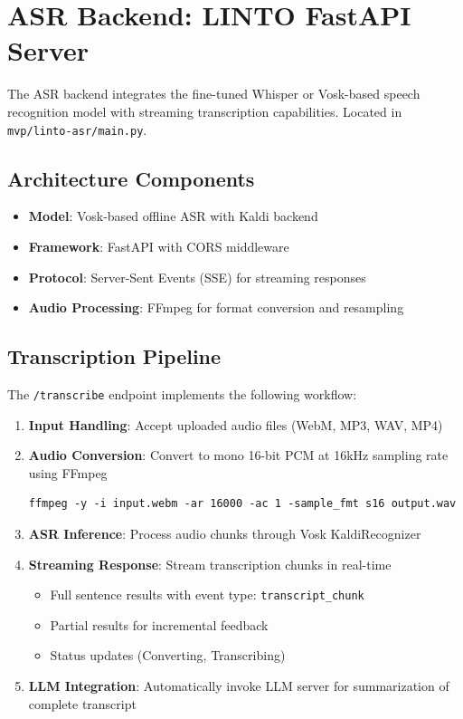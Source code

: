\documentclass[12pt,a4paper]{report}
\begin{document}
\section{ASR Backend: LINTO FastAPI Server}

The ASR backend integrates the fine-tuned Whisper or Vosk-based speech recognition model with streaming transcription capabilities. Located in \texttt{mvp/linto-asr/main.py}.

\subsection{Architecture Components}

\begin{itemize}
    \item \textbf{Model}: Vosk-based offline ASR with Kaldi backend
    \item \textbf{Framework}: FastAPI with CORS middleware
    \item \textbf{Protocol}: Server-Sent Events (SSE) for streaming responses
    \item \textbf{Audio Processing}: FFmpeg for format conversion and resampling
\end{itemize}

\subsection{Transcription Pipeline}

The \texttt{/transcribe} endpoint implements the following workflow:

\begin{enumerate}
    \item \textbf{Input Handling}: Accept uploaded audio files (WebM, MP3, WAV, MP4)
    \item \textbf{Audio Conversion}: Convert to mono 16-bit PCM at 16kHz sampling rate using FFmpeg
    \begin{verbatim}
ffmpeg -y -i input.webm -ar 16000 -ac 1 -sample_fmt s16 output.wav
    \end{verbatim}
    \item \textbf{ASR Inference}: Process audio chunks through Vosk KaldiRecognizer
    \item \textbf{Streaming Response}: Stream transcription chunks in real-time
    \begin{itemize}
        \item Full sentence results with event type: \texttt{transcript\_chunk}
        \item Partial results for incremental feedback
        \item Status updates (Converting, Transcribing)
    \end{itemize}
    \item \textbf{LLM Integration}: Automatically invoke LLM server for summarization of complete transcript
\end{enumerate}
\end{document}
